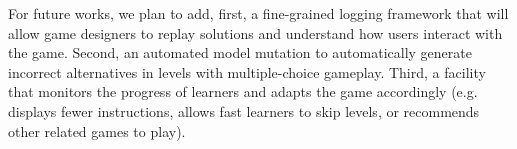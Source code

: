 \documentclass[conference]{IEEEtran}
\begin{document}
For future works, we plan to add, first, a fine-grained logging framework that will allow game designers to replay solutions and understand how users interact with the game. Second, an automated model mutation to automatically generate incorrect alternatives in levels with multiple-choice gameplay. Third, a facility that monitors the progress of learners and adapts the game accordingly (e.g. displays fewer instructions, allows fast learners to skip levels, or recommends other related games to play).

%
%



%
%
\end{document}
